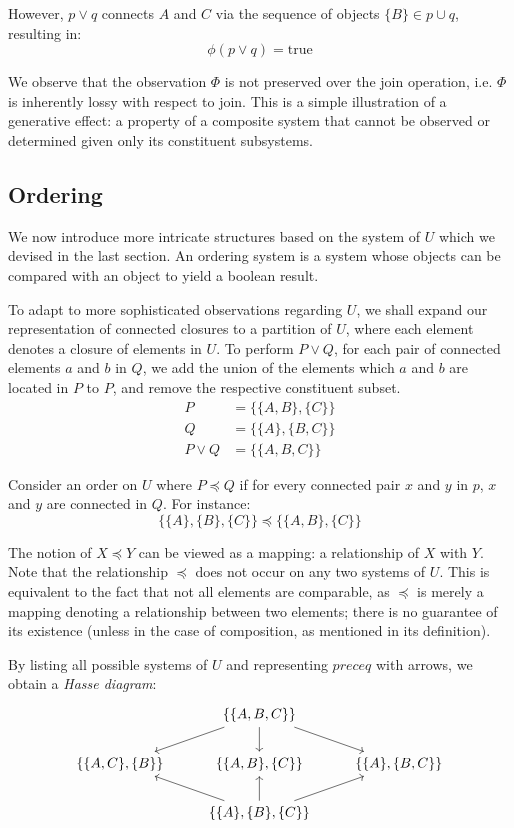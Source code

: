 \documentclass[12pt]{article}
\theoremstyle{definition}
\begin{document}
	However, $p \lor q$ connects $A$ and $C$ via the sequence of objects $\{B\} \in p \cup q$, resulting in: $$\phi(p \lor q) = \text{true}$$
	
	We observe that the observation $\Phi$ is not preserved over the join operation, i.e. $\Phi$ is inherently lossy with respect to join. This is a simple illustration of a generative effect: a property of a composite system that cannot be observed or determined given only its constituent subsystems.
	
	\subsection{Ordering}
	
	We now introduce more intricate structures based on the system of $U$ which we devised in the last section. An ordering system is a system whose objects can be compared with an object to yield a boolean result.
	
	To adapt to more sophisticated observations regarding $U$, we shall expand our representation of connected closures to a partition of $U$, where each element denotes a closure of elements in $U$. To perform $P \lor Q$, for each pair of connected elements $a$ and $b$ in $Q$, we add the union of the elements which $a$ and $b$ are located in $P$ to $P$, and remove the respective constituent subset.
	\begin{align*}
		P &= \{\{A, B\}, \{C\}\} \\
		Q &= \{\{A\}, \{B, C\}\} \\
		P \lor Q &= \{\{A, B, C\}\}
	\end{align*}
	
	Consider an order on $U$ where $P \preceq Q$ if for every connected pair $x$ and $y$ in $p$, $x$ and $y$ are connected in $Q$. For instance: $$\{\{A\}, \{B\}, \{C\}\} \preceq \{\{A, B\}, \{C\}\}$$
	
	The notion of $X \preceq Y$ can be viewed as a mapping: a relationship of $X$ with $Y$. Note that the relationship $\preceq$ does not occur on any two systems of $U$. This is equivalent to the fact that not all elements are comparable, as $\preceq$ is merely a mapping denoting a relationship between two elements; there is no guarantee of its existence (unless in the case of composition, as mentioned in its definition).
	
	By listing all possible systems of $U$ and representing $preceq$ with arrows, we obtain a \emph{Hasse diagram}:
	\begin{equation*}\begin{tikzcd}
		{} & \{\{A, B, C\}\} \ar[dl] \ar[d] \ar[dr] \\
		\{\{A, C\}, \{B\}\} & \{\{A, B\}, \{C\}\} & \{\{A\}, \{B, C\}\} \\
		{} & \{\{A\}, \{B\}, \{C\}\} \ar[ul] \ar[u] \ar[ur]
	\end{tikzcd}\end{equation*}
	
\end{document}
